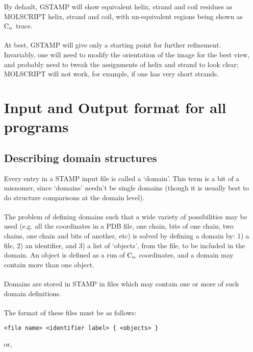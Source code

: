 By default, GSTAMP will show equivalent helix, strand and coil residues
as MOLSCRIPT \al helix, \be strand and coil, with un-equivalent regions 
being shown as ${\rm C}_{\alpha}$ trace.\\
\\
At best, GSTAMP will give only a starting point for further refinement.  
Invariably, one will need to modify the orientation of the image for the 
best view, and probably need to tweak the assignments of helix and strand 
to look clear; MOLSCRIPT will not work, for example, if one has very 
short \be strands.

\chapter{Input and Output format for all programs}

\section{Describing domain structures}

Every entry in a STAMP input file is called a `domain'.  This term
is a bit of a misnomer, since `domains' needn't be single domains
(though it is usually best to do structure comparisons at the domain level).\\
\\
The problem of defining domains such that a wide variety of 
possibilities may be used (e.g. all the coordinates in a PDB file,
one  chain, bits of one chain, two chains, one chain and bits of
another, etc) is solved by defining a domain by: 1) a file, 2) an
identifier, and 3) a list of `objects', from the file, to be
included in the domain.  An object is defined as a run of ${\rm C}_{\alpha}$
coordinates, and a domain may contain more than one object.\\
\\
Domains are stored in STAMP in files which may contain one or
more of such domain definitions.\\
\\
The format of these files must be as follows:\\

\begin{scriptsize}\begin{verbatim}
<file name> <identifier label> { <objects> }
\end{verbatim} \end{scriptsize}

or,\\

